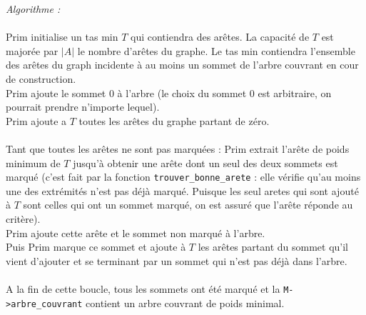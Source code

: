 \documentclass[a4paper,11pt]{article}
\begin{document}
\textit{Algorithme : } \\
\\
Prim initialise un tas min $T$ qui contiendra des arêtes. La capacité de $T$ est majorée par $|A|$ le nombre d'arêtes du graphe. Le tas min contiendra l'ensemble des arêtes du graph incidente à au moins un sommet de l'arbre couvrant en cour de construction.\\
Prim ajoute le sommet 0 à l'arbre (le choix du sommet 0 est arbitraire, on pourrait prendre n'importe lequel).\\
Prim ajoute a $T$ toutes les arêtes du graphe partant de zéro.\\
\\
Tant que toutes les arêtes ne sont pas marquées :
Prim extrait l'arête de poids minimum de $T$ jusqu'à obtenir une arête dont un seul des deux sommets est marqué (c'est fait par la fonction \texttt{trouver\_bonne\_arete} : elle vérifie qu'au moins une des extrémités n'est pas déjà marqué. Puisque les seul aretes qui sont ajouté à $T$ sont celles qui ont un sommet marqué, on est assuré que l'arête réponde au critère).\\
Prim ajoute cette arête et le sommet non marqué à l'arbre.\\
Puis Prim marque ce sommet et ajoute à $T$ les arêtes partant du sommet qu'il vient d'ajouter et se terminant par un sommet qui n'est pas déjà dans l'arbre.\\
\\
A la fin de cette boucle, tous les sommets ont été marqué et la \texttt{M->arbre\_couvrant} contient un arbre couvrant de poids minimal.\\
\end{document}
